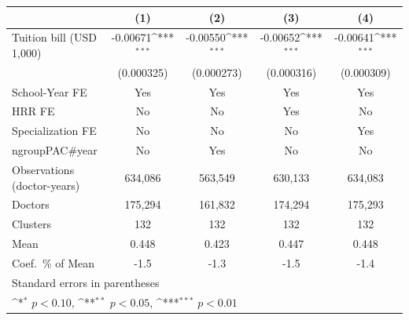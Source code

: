 {
\def\sym#1{\ifmmode^{#1}\else\(^{#1}\)\fi}
\begin{tabular}{l*{4}{c}}
\hline\hline
                    &\multicolumn{1}{c}{(1)}         &\multicolumn{1}{c}{(2)}         &\multicolumn{1}{c}{(3)}         &\multicolumn{1}{c}{(4)}         \\
\hline
Tuition bill (USD 1,000)&    -0.00671\sym{***}&    -0.00550\sym{***}&    -0.00652\sym{***}&    -0.00641\sym{***}\\
                    &  (0.000325)         &  (0.000273)         &  (0.000316)         &  (0.000309)         \\
[1em]
School-Year FE      &         Yes         &         Yes         &         Yes         &         Yes         \\
[1em]
HRR FE              &          No         &          No         &         Yes         &          No         \\
[1em]
Specialization FE   &          No         &          No         &          No         &         Yes         \\
[1em]
ngroupPAC#year      &          No         &         Yes         &          No         &          No         \\
\hline
Observations (doctor-years)&     634,086         &     563,549         &     630,133         &     634,083         \\
Doctors             &     175,294         &     161,832         &     174,294         &     175,293         \\
Clusters            &         132         &         132         &         132         &         132         \\
Mean                &       0.448         &       0.423         &       0.447         &       0.448         \\
Coef.\ \% of Mean   &        -1.5         &        -1.3         &        -1.5         &        -1.4         \\
\hline\hline
\multicolumn{5}{l}{\footnotesize Standard errors in parentheses}\\
\multicolumn{5}{l}{\footnotesize \sym{*} \(p<0.10\), \sym{**} \(p<0.05\), \sym{***} \(p<0.01\)}\\
\end{tabular}
}
